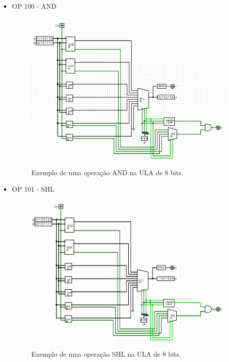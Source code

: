 \documentclass[
	12pt,				%
	openright,			%
	twoside,			%
	a4paper,			%
	english,			%
	french,				%
	spanish,			%
	brazil,				%
	]{abntex2}
\begin{document}
\begin{apendicesenv}
\begin{itemize}
\newpage
\item{OP 100 - AND}

\begin{figure}[H]
	\begin{center}
	    \includegraphics[scale=0.5]{alu8100and.png}
	\end{center}
\caption{\label{alu8100and}Exemplo de uma operação AND na ULA de 8 bits.}
\end{figure}

\newpage
\item{OP 101 - SHL}

\begin{figure}[H]
	\begin{center}
	    \includegraphics[scale=0.5]{alu8101shl.png}
	\end{center}
\caption{\label{alu8101shl}Exemplo de uma operação SHL na ULA de 8 bits.}
\end{figure}


\end{itemize}
\end{apendicesenv}
\end{document}
